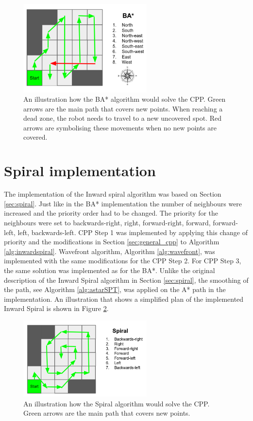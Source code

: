 \begin{figure}
    \centering
    \includegraphics[width=0.6\textwidth]{figures/examplebastar.png}
    \caption{An illustration how the BA* algorithm would solve the CPP. Green arrows are the main path that covers new points. When reaching a dead zone, the robot needs to travel to a new uncovered spot. Red arrows are symbolising these movements when no new points are covered.}
    \label{fig:examplebastar}
\end{figure}



\section{Spiral implementation}
\label{sec:spiral_impl}
 The implementation of the Inward spiral algorithm was based on Section \ref{sec:spiral}. Just like in the BA* implementation the number of neighbours were increased and the priority order had to be changed. The priority for the neighbours were set to backwards-right, right, forward-right, forward, forward-left, left, backwards-left. CPP Step 1  was implemented by applying this change of priority and the modifications in Section \ref{sec:general_cpp} to Algorithm \ref{alg:inwardspiral}. Wavefront algorithm, Algorithm \ref{alg:wavefront}, was implemented with the same modifications for the CPP Step 2. For CPP Step 3, the same solution was implemented as for the BA*. Unlike the original description of the Inward Spiral algorithm in Section \ref{sec:spiral}, the smoothing of the path, see Algorithm \ref{alg:astarSPT}, was applied on the A* path in the implementation.  An illustration that shows a simplified plan of the implemented Inward Spiral is shown in Figure \ref{fig:examplespiral}.

\begin{figure}
    \centering
    \includegraphics[width=0.6\textwidth]{figures/examplespiral.png}
    \caption{An illustration how the Spiral algorithm would solve the CPP. Green arrows are the main path that covers new points.}
    \label{fig:examplespiral}
\end{figure}

